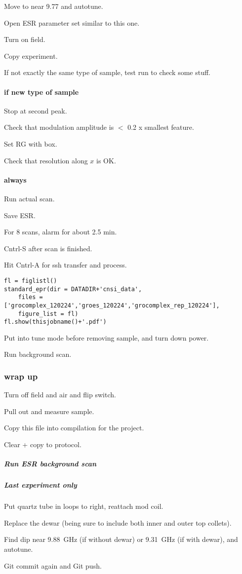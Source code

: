 Move to near 9.77 and autotune.

Open ESR parameter set similar to this one.

Turn on field.

Copy experiment.

If not exactly the same type of sample, test run to check some stuff.


\paragraph{if new type of sample}
Stop at second peak.

Check that modulation amplitude is $<$ 0.2 x smallest feature.

Set RG with box.

Check that resolution along $x$ is OK.

\paragraph{always}

Run actual scan.

Save ESR.

For 8 scans, alarm for about 2.5 min.

Cntrl-S after scan is finished.

Hit Cntrl-A for ssh transfer and process.


\begin{tiny}
\begin{lstlisting}
fl = figlistl()
standard_epr(dir = DATADIR+'cnsi_data',
    files = ['grocomplex_120224','groes_120224','grocomplex_rep_120224'],
    figure_list = fl)
fl.show(thisjobname()+'.pdf')
\end{lstlisting}
\end{tiny}

Put into tune mode before removing sample, and turn down power.

Run background scan.

\subsubsection{wrap up}
Turn off field and air and flip switch.

Pull out and measure sample.

Copy this file into compilation for the project.

Clear + copy to protocol.

\subparagraph{Run ESR background scan}
\subparagraph{Last experiment only}
Put quartz tube in loops to right, reattach mod coil.

Replace the dewar (being sure to include both inner and outer top collets).

Find dip near 9.88~GHz (if without dewar) or 9.31~GHz (if with dewar), and autotune.

Git commit again and Git push.


\timeblockend
